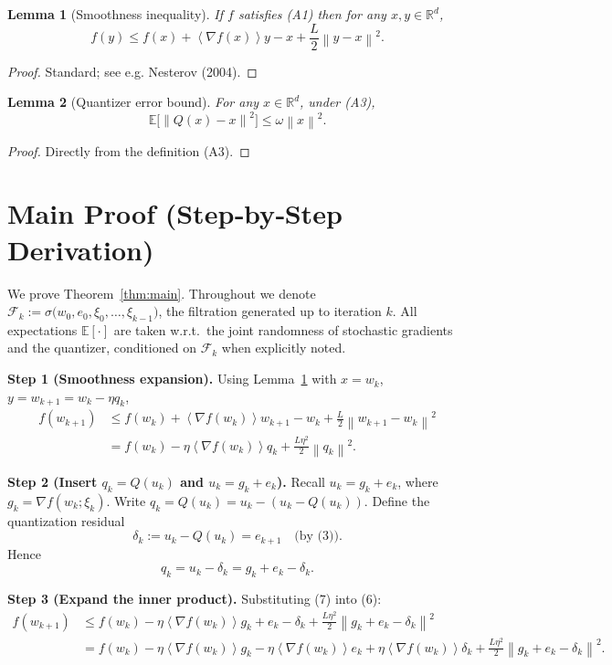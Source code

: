 \documentclass{article}
\newtheorem{lemma}{Lemma}
\newcommand{\E}{\mathbb{E}}
\newcommand{\R}{\mathbb{R}}
\newcommand{\norm}[1]{\left\|#1\right\|}
\newcommand{\inner}[1]{\left\langle#1\right\rangle}
\begin{document}
\begin{lemma}[Smoothness inequality]\label{lem:smooth}
If $f$ satisfies (A1) then for any $x,y\in\R^d$,
\[
f(y)\le f(x)+\inner{\nabla f(x)}{y-x}+\frac{L}{2}\norm{y-x}^2 .
\]
\end{lemma}
\begin{proof}
Standard; see e.g. Nesterov (2004). \hfill\qedhere
\end{proof}

\begin{lemma}[Quantizer error bound]\label{lem:quant}
For any $x\in\R^d$, under (A3),
\[
\E\!\bigl[\norm{Q(x)-x}^2\bigr]\le\omega\norm{x}^2 .
\]
\end{lemma}
\begin{proof}
Directly from the definition (A3). \hfill\qedhere
\end{proof}

\section*{Main Proof (Step‑by‑Step Derivation)}
We prove Theorem~\ref{thm:main}.  Throughout we denote
$\mathcal{F}_k:=\sigma\bigl(w_0,e_0,\xi_0,\dots,\xi_{k-1}\bigr)$,
the filtration generated up to iteration $k$.
All expectations $\E[\cdot]$ are taken w.r.t.\ the joint randomness of
stochastic gradients and the quantizer, conditioned on $\mathcal{F}_k$ when
explicitly noted.

\bigskip
\noindent\textbf{Step 1 (Smoothness expansion).}  
Using Lemma~\ref{lem:smooth} with $x=w_k$, $y=w_{k+1}=w_k-\eta q_k$,
\begin{align}
f(w_{k+1})
&\le f(w_k)+\inner{\nabla f(w_k)}{w_{k+1}-w_k}
     +\frac{L}{2}\norm{w_{k+1}-w_k}^2 \nonumber\\
&= f(w_k)-\eta\inner{\nabla f(w_k)}{q_k}
     +\frac{L\eta^{2}}{2}\norm{q_k}^{2}. \tag{6}
\end{align}
\noindent[Step 1]

\bigskip
\noindent\textbf{Step 2 (Insert $q_k=Q(u_k)$ and $u_k=g_k+e_k$).}  
Recall $u_k=g_k+e_k$, where $g_k=\nabla f(w_k;\xi_k)$.
Write $q_k=Q(u_k)=u_k-(u_k-Q(u_k))$.
Define the quantization residual
\[
\delta_k:=u_k-Q(u_k)=e_{k+1}\quad\text{(by (3)).}
\]
Hence
\[
q_k = u_k-\delta_k = g_k+e_k-\delta_k .\tag{7}
\]
\noindent[Step 2]

\bigskip
\noindent\textbf{Step 3 (Expand the inner product).}
Substituting (7) into (6):
\begin{align}
f(w_{k+1})
&\le f(w_k)-\eta\inner{\nabla f(w_k)}{g_k+e_k-\delta_k}
     +\frac{L\eta^{2}}{2}\norm{g_k+e_k-\delta_k}^{2} \nonumber\\
&= f(w_k)-\eta\inner{\nabla f(w_k)}{g_k}
     -\eta\inner{\nabla f(w_k)}{e_k}
     +\eta\inner{\nabla f(w_k)}{\delta_k}
     +\frac{L\eta^{2}}{2}\norm{g_k+e_k-\delta_k}^{2}. \tag{8}
\end{align}
\noindent[Step 3]
\end{document}
